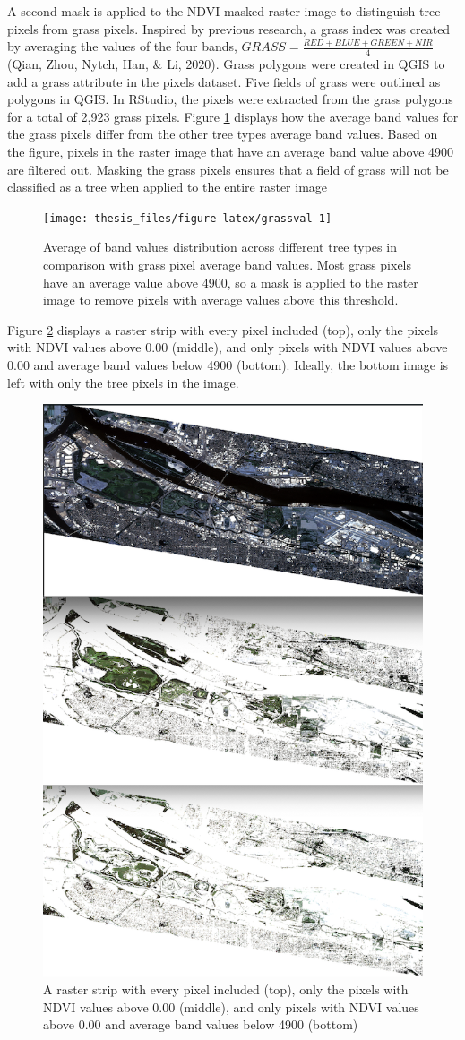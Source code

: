 \documentclass[12pt,twoside]{reedthesis}
\begin{document}
A second mask is applied to the NDVI masked raster image to distinguish tree pixels from grass pixels. Inspired by previous research, a grass index was created by averaging the values of the four bands, \(GRASS = \frac{RED + BLUE + GREEN + NIR}{4}\) (Qian, Zhou, Nytch, Han, \& Li, 2020). Grass polygons were created in QGIS to add a grass attribute in the pixels dataset. Five fields of grass were outlined as polygons in QGIS. In RStudio, the pixels were extracted from the grass polygons for a total of 2,923 grass pixels. Figure \ref{fig:grassval} displays how the average band values for the grass pixels differ from the other tree types average band values. Based on the figure, pixels in the raster image that have an average band value above 4900 are filtered out. Masking the grass pixels ensures that a field of grass will not be classified as a tree when applied to the entire raster image
\begin{figure}

{\centering \texttt{[image: thesis\_files/figure-latex/grassval-1]} 

}

\caption{Average of band values distribution across different tree types in comparison with grass pixel average band values. Most grass pixels have an average value above 4900, so a mask is applied to the raster image to remove pixels with average values above this threshold.}\label{fig:grassval}
\end{figure}
Figure \ref{fig:beforeaftermask} displays a raster strip with every pixel included (top), only the pixels with NDVI values above 0.00 (middle), and only pixels with NDVI values above 0.00 and average band values below 4900 (bottom). Ideally, the bottom image is left with only the tree pixels in the image.
\begin{figure}

{\centering \includegraphics[width=0.4\linewidth]{figure/beforeaftermask} 

}

\caption{A raster strip with every pixel included (top), only the pixels with NDVI values above 0.00 (middle), and only pixels with NDVI values above 0.00 and average band values below 4900 (bottom)}\label{fig:beforeaftermask}
\end{figure}
\end{document}
